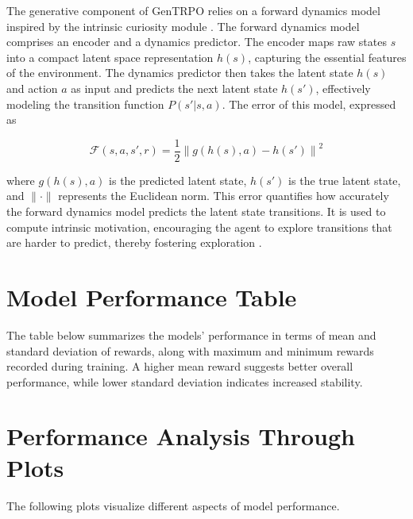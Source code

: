 \documentclass{article}
\begin{document}
The generative component of GenTRPO relies on a forward dynamics model inspired by the intrinsic curiosity module \cite{pathak2017curiositydrivenexplorationselfsupervisedprediction}. The forward dynamics model comprises an encoder and a dynamics predictor. The encoder maps raw states \( s \) into a compact latent space representation \( h(s) \), capturing the essential features of the environment. The dynamics predictor then takes the latent state \( h(s) \) and action \( a \) as input and predicts the next latent state \( h(s') \), effectively modeling the transition function \( P(s' | s, a) \). The error of this model, expressed as 

\begin{equation}
  \mathcal{F}(s, a, s', r) = \frac{1}{2} \left\| g(h(s), a) - h(s') \right\|^2
\end{equation}

where \( g(h(s), a) \) is the predicted latent state, \( h(s') \) is the true latent state, and \( \| \cdot \| \) represents the Euclidean norm. This error quantifies how accurately the forward dynamics model predicts the latent state transitions. It is used to compute intrinsic motivation, encouraging the agent to explore transitions that are harder to predict, thereby fostering exploration  \cite{wang2024prioritizedgenerativereplay}.




\section{Model Performance Table}

The table below summarizes the models' performance in terms of mean and standard deviation of rewards, along with maximum and minimum rewards recorded during training. A higher mean reward suggests better overall performance, while lower standard deviation indicates increased stability.

\bigskip
\begin{center}
  
\end{center}
\bigskip

\section{Performance Analysis Through Plots}

The following plots visualize different aspects of model performance.
\end{document}
